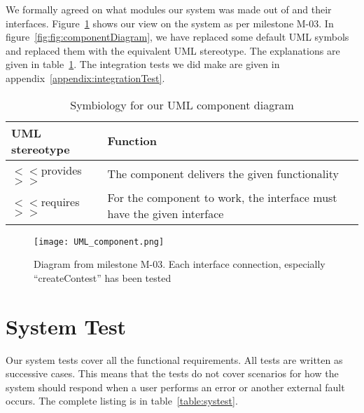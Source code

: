 We formally agreed on what modules our system was made out of and their
interfaces. Figure~\ref{fig:componentDiagram} shows our view on the system as
per milestone M-03. In figure~\ref{fig:fig:componentDiagram}, we have replaced
some default UML symbols and replaced them with the equivalent UML stereotype.
The explanations are given in table~\ref{table:component}. The integration
tests we did make are given in appendix~\ref{appendix:integrationTest}.

\begin{longtable}{|l|p{}|}
    \caption{Symbiology for our UML component diagram} \label{table:component} \\
    \hline
    \textbf{UML stereotype} & \textbf{Function}\\
    \hline

    $<<$provides$>>$ & The component delivers the given functionality \\
    \hline

    $<<$requires$>>$& For the component to work, the interface must have the given interface\\
        \hline
\end{longtable}

\begin{figure}[h!]
    \texttt{[image: UML\_component.png]} 
    \caption{Diagram from milestone M-03. Each interface connection,
            especially ``createContest'' has been tested}
        \label{fig:componentDiagram}
\end{figure}

\section{System Test}
Our system tests cover all the functional requirements. All tests are
written as successive cases. This means that the tests do not cover
scenarios for how the system should respond when a user performs an
error or another external fault occurs. The complete listing is in
table~\ref{table:systest}.

